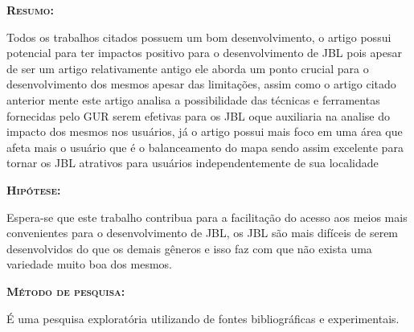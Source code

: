 \documentclass[12pt,a4paper]{article}
\begin{document}
\begin{flushleft}
\textbf{\textsc{Resumo:}}
\end{flushleft}

	Todos os trabalhos citados possuem um bom desenvolvimento, o artigo \cite{Luis} possui potencial para ter impactos positivo para o desenvolvimento de JBL pois apesar de ser um artigo relativamente antigo ele aborda um ponto crucial para o desenvolvimento dos mesmos apesar das limitações, assim como o artigo citado anterior mente este artigo \cite{Nayana} analisa a possibilidade das técnicas e ferramentas fornecidas pelo GUR serem efetivas para os JBL oque auxiliaria na analise do impacto dos mesmos nos usuários, já o artigo \cite{Maia} possui mais foco em uma área que afeta mais o usuário que é o balanceamento do mapa sendo assim excelente para tornar os JBL atrativos para usuários independentemente de sua localidade
	
\begin{flushleft}
\textbf{\textsc{Hipótese:}}
\end{flushleft}

	Espera-se que este trabalho contribua para a facilitação do acesso aos meios mais convenientes para o desenvolvimento de JBL, os JBL são mais difíceis de serem desenvolvidos do que os demais gêneros e isso faz com que não exista uma variedade muito boa dos mesmos.
	
\begin{flushleft}
\textbf{\textsc{Método de pesquisa:}}
\end{flushleft}

	É uma pesquisa exploratória utilizando de fontes bibliográficas e experimentais.
	


\end{document}
